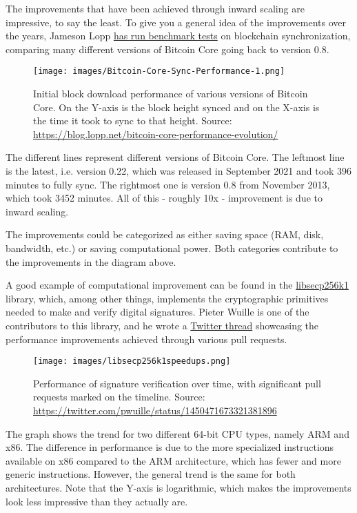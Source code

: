 The improvements that have been achieved through inward scaling are
impressive, to say the least. To give you a general idea of the
improvements over the years, Jameson Lopp
\href{https://blog.lopp.net/bitcoin-core-performance-evolution/}{has run
benchmark tests} on blockchain synchronization, comparing many different
versions of Bitcoin Core going back to version 0.8.

\begin{figure}
\centering
\texttt{[image: images/Bitcoin-Core-Sync-Performance-1.png]}
\caption{Initial block download performance of various versions of
Bitcoin Core. On the Y-axis is the block height synced and on the X-axis
is the time it took to sync to that height. Source:
\url{https://blog.lopp.net/bitcoin-core-performance-evolution/}}
\end{figure}

The different lines represent different versions of Bitcoin Core. The
leftmost line is the latest, i.e. version 0.22, which was released in
September 2021 and took 396 minutes to fully sync. The rightmost one is
version 0.8 from November 2013, which took 3452 minutes. All of this -
roughly 10x - improvement is due to inward scaling.

The improvements could be categorized as either saving space (RAM, disk,
bandwidth, etc.) or saving computational power. Both categories
contribute to the improvements in the diagram above.

A good example of computational improvement can be found in the
\href{https://github.com/bitcoin-core/secp256k1}{libsecp256k1} library,
which, among other things, implements the cryptographic primitives
needed to make and verify digital signatures. Pieter Wuille is one of
the contributors to this library, and he wrote a
\href{https://twitter.com/pwuille/status/1450471673321381896}{Twitter
thread} showcasing the performance improvements achieved through various
pull requests.

\begin{figure}
\centering
\texttt{[image: images/libsecp256k1speedups.png]}
\caption{Performance of signature verification over time, with
significant pull requests marked on the timeline. Source:
\url{https://twitter.com/pwuille/status/1450471673321381896}}
\end{figure}

The graph shows the trend for two different 64-bit CPU types, namely ARM
and x86. The difference in performance is due to the more specialized
instructions available on x86 compared to the ARM architecture, which
has fewer and more generic instructions. However, the general trend is
the same for both architectures. Note that the Y-axis is logarithmic,
which makes the improvements look less impressive than they actually
are.

